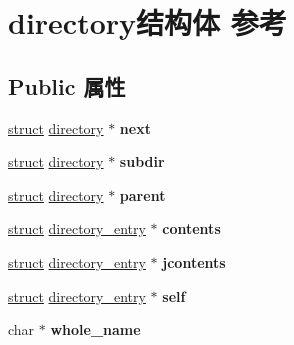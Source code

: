 \hypertarget{structdirectory}{}\section{directory结构体 参考}
\label{structdirectory}
\subsection*{Public 属性}
\begin{DoxyCompactItemize}
\item 
\mbox{\label{structdirectory_aace8aada7be041a518c168e1b9762487}} 
\hyperlink{interfacestruct}{struct} \hyperlink{structdirectory}{directory} $\ast$ {\bfseries next}
\item 
\mbox{\label{structdirectory_a76590e253e41087f080d7bd7563a251a}} 
\hyperlink{interfacestruct}{struct} \hyperlink{structdirectory}{directory} $\ast$ {\bfseries subdir}
\item 
\mbox{\label{structdirectory_a06e4e58f863915af5cf56e8aa7d64cd1}} 
\hyperlink{interfacestruct}{struct} \hyperlink{structdirectory}{directory} $\ast$ {\bfseries parent}
\item 
\mbox{\label{structdirectory_abc756dcb2fa6ffe9a39a6db125eed20a}} 
\hyperlink{interfacestruct}{struct} \hyperlink{structdirectory__entry}{directory\+\_\+entry} $\ast$ {\bfseries contents}
\item 
\mbox{\label{structdirectory_a2679b817387583be2daa563a830d5a0b}} 
\hyperlink{interfacestruct}{struct} \hyperlink{structdirectory__entry}{directory\+\_\+entry} $\ast$ {\bfseries jcontents}
\item 
\mbox{\label{structdirectory_ab2b2982cb04ca300afa0f6445526a94c}} 
\hyperlink{interfacestruct}{struct} \hyperlink{structdirectory__entry}{directory\+\_\+entry} $\ast$ {\bfseries self}
\item 
\mbox{\label{structdirectory_a2add93afd4f80da6f119ae5a12bd5afa}} 
char $\ast$ {\bfseries whole\+\_\+name}
\item 
\mbox{\label{structdirectory_a2c885432927b2742a111c149edc541e9}} 

\end{DoxyCompactItemize}
